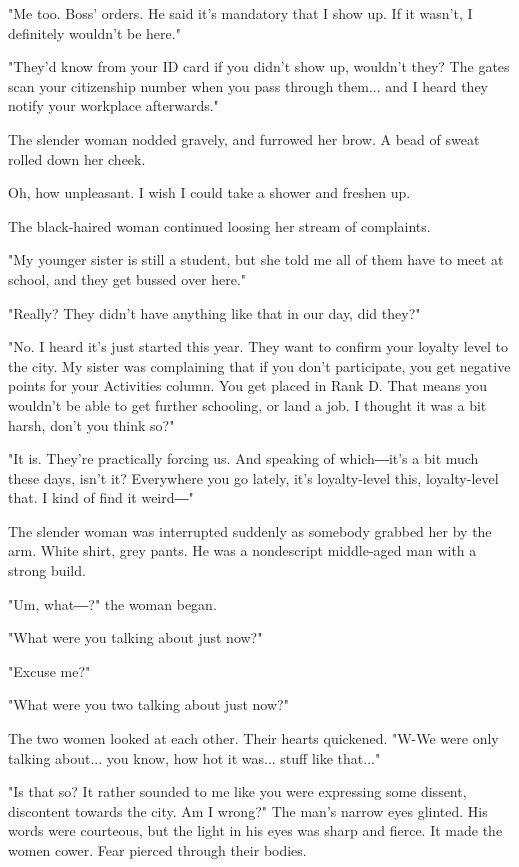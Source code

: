 "Me too. Boss' orders. He said it's mandatory that I show up. If it
wasn't, I definitely wouldn't be here."

"They'd know from your ID card if you didn't show up, wouldn't they? The
gates scan your citizenship number when you pass through them... and I
heard they notify your workplace afterwards."

The slender woman nodded gravely, and furrowed her brow. A bead of sweat
rolled down her cheek.

Oh, how unpleasant. I wish I could take a shower and freshen up.

The black-haired woman continued loosing her stream of complaints.

"My younger sister is still a student, but she told me all of them have
to meet at school, and they get bussed over here."

"Really? They didn't have anything like that in our day, did they?"

"No. I heard it's just started this year. They want to confirm your
loyalty level to the city. My sister was complaining that if you don't
participate, you get negative points for your Activities column. You get
placed in Rank D. That means you wouldn't be able to get further
schooling, or land a job. I thought it was a bit harsh, don't you think
so?"

"It is. They're practically forcing us. And speaking of which―it's a bit
much these days, isn't it? Everywhere you go lately, it's loyalty-level
this, loyalty-level that. I kind of find it weird―"

The slender woman was interrupted suddenly as somebody grabbed her by
the arm. White shirt, grey pants. He was a nondescript middle-aged man
with a strong build.

"Um, what―?" the woman began.

"What were you talking about just now?"

"Excuse me?"

"What were you two talking about just now?"

The two women looked at each other. Their hearts quickened. "W-We were
only talking about... you know, how hot it was... stuff like that..."

"Is that so? It rather sounded to me like you were expressing some
dissent, discontent towards the city. Am I wrong?" The man's narrow eyes
glinted. His words were courteous, but the light in his eyes was sharp
and fierce. It made the women cower. Fear pierced through their bodies.

